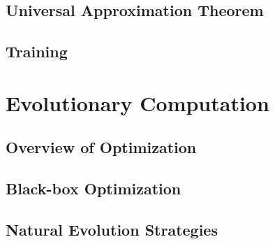 \subsection{Universal Approximation Theorem}
\subsection{Training}

\section{Evolutionary Computation}
\subsection{Overview of Optimization}
\subsection{Black-box Optimization}
\subsection{Natural Evolution Strategies}